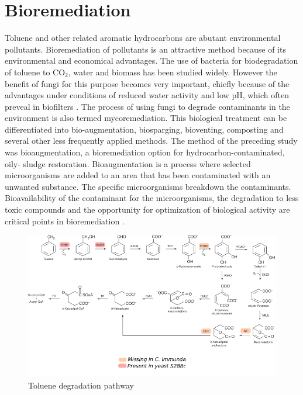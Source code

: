 \documentclass[12pt, a4paper]{report}
\begin{document}
\section{Bioremediation}
Toluene and other related aromatic hydrocarbons are abutant environmental pollutants. Bioremediation of pollutants is an attractive method because of its environmental and economical advantages. The use of bacteria for biodegradation of toluene to CO$_2$, water and biomass has been studied widely. However the benefit of fungi for this purpose becomes very important, chiefly because of the advantages under conditions of reduced water activity and low pH, which often preveal in biofilters \cite{Luykx2003}.  The process of using fungi to degrade contaminants in the environment is also termed mycoremediation. This biological treatment can be differentiated into bio-augmentation, biosparging, bioventing, composting and several other less frequently applied methods. The method of the preceding study was bioaugmentation, a bioremediation option for hydrocarbon-contaminated, oily- sludge restoration. Bioaugmentation is a process where selected microorganisms are added to an area that has been contaminated with an unwanted substance. The specific microorganisms breakdown the contaminants. Bioavailability of the contaminant for the microorganisms, the degradation to less toxic compounds and the opportunity for optimization of biological activity are critical points in bioremediation \cite{Poyntner2014}.  \\

\begin{figure}[H]
	\centering	
	\includegraphics[width=360pt]{pics/toluenpathway.png}
	\caption[Toluene degradation pathway]
	{Toluene degradation pathway \cite{Parales2008}}
	\label{Toluendeg}
\end{figure}
\end{document}
